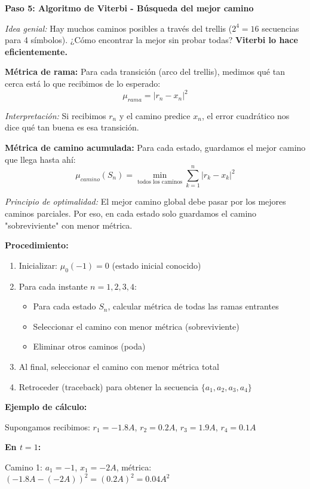 \documentclass[11pt,a4paper]{article}
\begin{document}
\textbf{Paso 5: Algoritmo de Viterbi - Búsqueda del mejor camino}

\textit{Idea genial:} Hay muchos caminos posibles a través del trellis ($2^4 = 16$ secuencias para 4 símbolos). ¿Cómo encontrar la mejor sin probar todas? \textbf{Viterbi lo hace eficientemente.}

\textbf{Métrica de rama:} Para cada transición (arco del trellis), medimos qué tan cerca está lo que recibimos de lo esperado:
\[
\mu_{rama} = |r_n - x_n|^2
\]

\textit{Interpretación:} Si recibimos $r_n$ y el camino predice $x_n$, el error cuadrático nos dice qué tan buena es esa transición.

\textbf{Métrica de camino acumulada:} Para cada estado, guardamos el mejor camino que llega hasta ahí:
\[
\mu_{camino}(S_n) = \min_{\text{todos los caminos}} \sum_{k=1}^{n} |r_k - x_k|^2
\]

\textit{Principio de optimalidad:} El mejor camino global debe pasar por los mejores caminos parciales. Por eso, en cada estado solo guardamos el camino "sobreviviente" con menor métrica.

\textbf{Procedimiento:}

\begin{enumerate}
    \item Inicializar: $\mu_0(-1) = 0$ (estado inicial conocido)
    \item Para cada instante $n = 1, 2, 3, 4$:
    \begin{itemize}
        \item Para cada estado $S_n$, calcular métrica de todas las ramas entrantes
        \item Seleccionar el camino con menor métrica (sobreviviente)
        \item Eliminar otros caminos (poda)
    \end{itemize}
    \item Al final, seleccionar el camino con menor métrica total
    \item Retroceder (traceback) para obtener la secuencia $\{a_1, a_2, a_3, a_4\}$
\end{enumerate}

\textbf{Ejemplo de cálculo:}

Supongamos recibimos: $r_1 = -1.8A$, $r_2 = 0.2A$, $r_3 = 1.9A$, $r_4 = 0.1A$

\textbf{En $t=1$:}

Camino 1: $a_1 = -1$, $x_1 = -2A$, métrica: $(-1.8A - (-2A))^2 = (0.2A)^2 = 0.04A^2$
\end{document}
